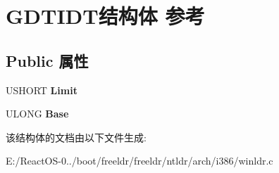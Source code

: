 \hypertarget{struct_g_d_t_i_d_t}{}\section{G\+D\+T\+I\+D\+T结构体 参考}
\label{struct_g_d_t_i_d_t}
\subsection*{Public 属性}
\begin{DoxyCompactItemize}
\item 
\mbox{\label{struct_g_d_t_i_d_t_a2bd5cf11939091f40c1bdd85f9c6670f}} 
U\+S\+H\+O\+RT {\bfseries Limit}
\item 
\mbox{\label{struct_g_d_t_i_d_t_afbadbaec7a5fa7c1721c10f9dacf7239}} 
U\+L\+O\+NG {\bfseries Base}
\end{DoxyCompactItemize}


该结构体的文档由以下文件生成\+:\begin{DoxyCompactItemize}
\item 
E\+:/\+React\+O\+S-\/0../boot/freeldr/freeldr/ntldr/arch/i386/winldr.\+c\end{DoxyCompactItemize}
